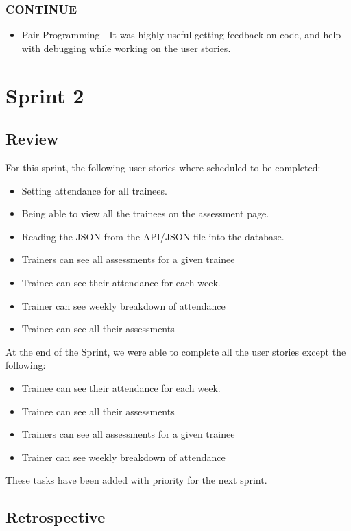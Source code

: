 \documentclass[]{report}
\begin{document}
			\subsection*{CONTINUE}
				\begin{itemize}
					\item Pair Programming - It was highly useful getting feedback on code, and help with debugging while working on the user stories.
				\end{itemize}
	\chapter*{Sprint 2}
		\section*{Review}
			For this sprint, the following user stories where scheduled to be completed:
			\begin{itemize}
				\item Setting attendance for all trainees.
				\item Being able to view all the trainees on the assessment page.
				\item Reading the JSON from the API/JSON file into the database.
				\item Trainers can see all assessments for a given trainee
				\item Trainee can see their attendance for each week.
				\item Trainer can see weekly breakdown of attendance
				\item Trainee can see all their assessments
			\end{itemize}
			At the end of the Sprint, we were able to complete all the user stories except the following:
			\begin{itemize}
				\item Trainee can see their attendance for each week.
				\item Trainee can see all their assessments
				\item Trainers can see all assessments for a given trainee
				\item Trainer can see weekly breakdown of attendance
			\end{itemize}
			These tasks have been added with priority for the next sprint.
		\section*{Retrospective}
\end{document}
